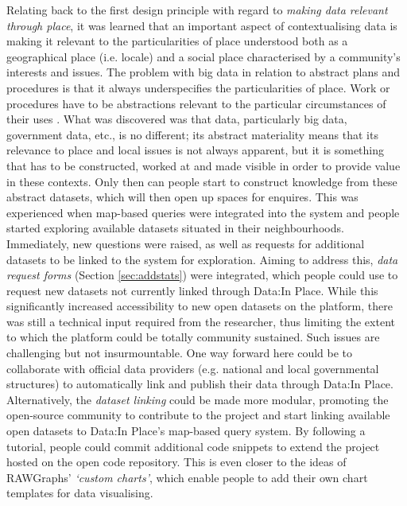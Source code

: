 Relating back to the first design principle with regard to \textit{making data relevant through place}, it was learned that an important aspect of contextualising data is making it relevant to the particularities of place understood both as a geographical place (i.e. locale) and a social place characterised by a community's interests and issues. The problem with big data in relation to abstract plans and procedures is that it always underspecifies the particularities of place. Work or procedures have to be abstractions relevant to the particular circumstances of their uses \citep{suchman_human-machine_2007,suchman_plans_1985,taylor_data--place:_2015}. What was discovered was that data, particularly big data, government data, etc., is no different; its abstract materiality means that its relevance to place and local issues is not always apparent, but it is something that has to be constructed, worked at and made visible in order to provide value in these contexts. Only then can people start to construct knowledge from these abstract datasets, which will then open up spaces for enquires. This was experienced when map-based queries were integrated into the system and people started exploring available datasets situated in their neighbourhoods. Immediately, new questions were raised, as well as requests for additional datasets to be linked to the system for exploration. Aiming to address this, \textit{data request forms} (Section 
\ref{sec:addstats}) were integrated, which people could use to request new datasets not currently linked through Data:In Place. While this significantly increased accessibility to new open datasets on the platform, there was still a technical input required from the researcher, thus limiting the extent to which the platform could be totally community sustained. Such issues are challenging but not insurmountable. One way forward here could be to collaborate with official data providers (e.g. national and local governmental structures) to automatically link and publish their data through Data:In Place. Alternatively, the \textit{dataset linking} could be made more modular, promoting the open-source community to contribute to the project and start linking available open datasets to Data:In Place's map-based query system. By following a tutorial, people could commit additional code snippets to extend the project hosted on the open code repository. This is even closer to the ideas of RAWGraphs' \citep{mauri_rawgraphs:_2017} \textit{`custom charts'}, which enable people to add their own chart templates for data visualising.

